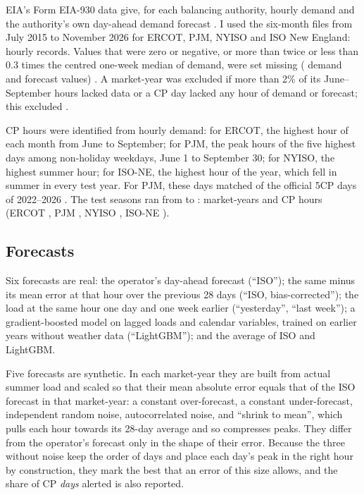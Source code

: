 \documentclass[preprint,12pt,authoryear]{elsarticle}
\begin{document}
EIA's Form EIA-930 data give, for each balancing authority, hourly demand and the authority's own day-ahead demand forecast \citep{eia930}. I used the six-month files from July 2015 to November 2026 for ERCOT, PJM, NYISO and ISO New England:  hourly records. Values that were zero or negative, or more than twice or less than 0.3 times the centred one-week median of demand, were set missing ( demand and  forecast values) \citep{ruggles2020eia}. A market-year was excluded if more than 2\% of its June--September hours lacked data or a CP day lacked any hour of demand or forecast; this excluded .

CP hours were identified from hourly demand: for ERCOT, the highest hour of each month from June to September; for PJM, the peak hours of the five highest days among non-holiday weekdays, June 1 to September 30; for NYISO, the highest summer hour; for ISO-NE, the highest hour of the year, which fell in summer in every test year. For PJM, these days matched  of the  official 5CP days of 2022--2026 \citep{pjm5cp}. The test seasons ran from  to :  market-years and  CP hours (ERCOT , PJM , NYISO , ISO-NE ).

\subsection{Forecasts}

Six forecasts are real: the operator's day-ahead forecast (``ISO''); the same minus its mean error at that hour over the previous 28 days (``ISO, bias-corrected''); the load at the same hour one day and one week earlier (``yesterday'', ``last week''); a gradient-boosted model \citep{ke2017lightgbm} on lagged loads and calendar variables, trained on earlier years without weather data (``LightGBM''); and the average of ISO and LightGBM.

Five forecasts are synthetic. In each market-year they are built from actual summer load and scaled so that their mean absolute error equals that of the ISO forecast in that market-year: a constant over-forecast, a constant under-forecast, independent random noise, autocorrelated noise, and ``shrink to mean'', which pulls each hour towards its 28-day average and so compresses peaks. They differ from the operator's forecast only in the shape of their error. Because the three without noise keep the order of days and place each day's peak in the right hour by construction, they mark the best that an error of this size allows, and the share of CP \emph{days} alerted is also reported.
\end{document}
